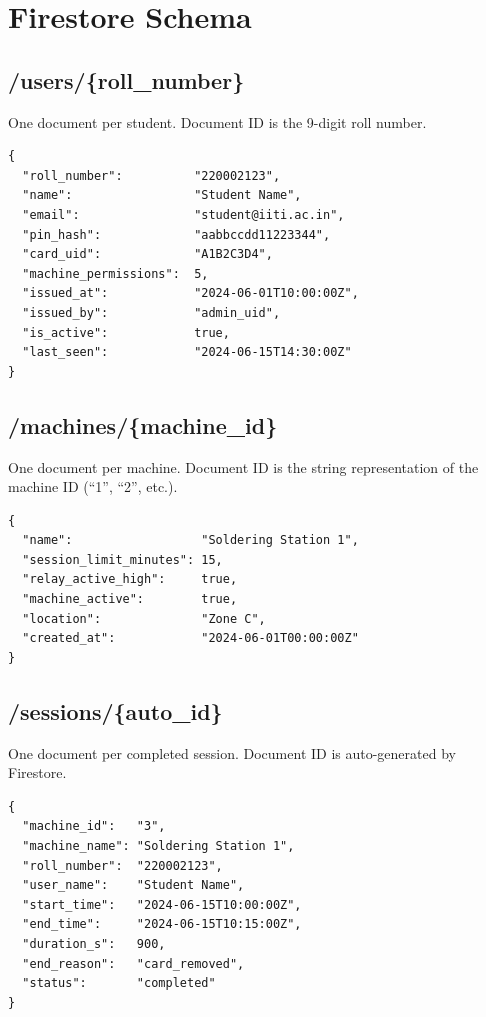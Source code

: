\section{Firestore Schema}

\subsection{/users/\{roll\_number\}}

One document per student. Document ID is the 9-digit roll number.

\begin{lstlisting}[style=jsonlstyle,caption={/users/220002123}]
{
  "roll_number":          "220002123",
  "name":                 "Student Name",
  "email":                "student@iiti.ac.in",
  "pin_hash":             "aabbccdd11223344",
  "card_uid":             "A1B2C3D4",
  "machine_permissions":  5,
  "issued_at":            "2024-06-01T10:00:00Z",
  "issued_by":            "admin_uid",
  "is_active":            true,
  "last_seen":            "2024-06-15T14:30:00Z"
}
\end{lstlisting}

\subsection{/machines/\{machine\_id\}}

One document per machine. Document ID is the string representation of the machine ID (``1'', ``2'', etc.).

\begin{lstlisting}[style=jsonlstyle,caption={/machines/3}]
{
  "name":                  "Soldering Station 1",
  "session_limit_minutes": 15,
  "relay_active_high":     true,
  "machine_active":        true,
  "location":              "Zone C",
  "created_at":            "2024-06-01T00:00:00Z"
}
\end{lstlisting}

\subsection{/sessions/\{auto\_id\}}

One document per completed session. Document ID is auto-generated by Firestore.

\begin{lstlisting}[style=jsonlstyle,caption={/sessions/auto-generated-id}]
{
  "machine_id":   "3",
  "machine_name": "Soldering Station 1",
  "roll_number":  "220002123",
  "user_name":    "Student Name",
  "start_time":   "2024-06-15T10:00:00Z",
  "end_time":     "2024-06-15T10:15:00Z",
  "duration_s":   900,
  "end_reason":   "card_removed",
  "status":       "completed"
}
\end{lstlisting}

